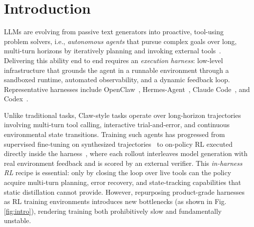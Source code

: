 \documentclass[letterpaper]{article} %
\begin{document}

\section{Introduction}
LLMs are evolving from passive text generators into proactive, tool-using problem solvers, i.e., \emph{autonomous agents} that pursue complex goals over long, multi-turn horizons by iteratively planning and invoking external tools~\citep{lopopolo2026harness}. 
Delivering this ability end to end requires an \emph{execution harness}: low-level infrastructure that grounds the agent in a runnable environment through a sandboxed runtime, automated observability, and a dynamic feedback loop. 
Representative harnesses include OpenClaw~\citep{openclaw}, Hermes-Agent~\citep{nousresearch2026hermes}, Claude Code~\citep{claudecode}, and Codex~\citep{openai2025codex}.

Unlike traditional tasks, Claw-style tasks operate over long-horizon trajectories involving multi-turn tool calling, interactive trial-and-error, and continuous environmental state transitions. 
Training such agents has progressed from supervised fine-tuning on synthesized trajectories~\citep{bai2026clawgym,xia2026metaclaw} to on-policy RL executed directly inside the harness~\citep{xu2026polar,wang2026openclaw}, where each rollout interleaves model generation with real environment feedback and is scored by an external verifier.
This \emph{in-harness RL} recipe is essential: only by closing the loop over live tools can the policy acquire multi-turn planning, error recovery, and state-tracking capabilities that static distillation cannot provide.
However, repurposing product-grade harnesses as RL training environments introduces new bottlenecks (as shown in Fig. \ref{fig:intro}), rendering training both prohibitively slow and fundamentally unstable. 
\end{document}
